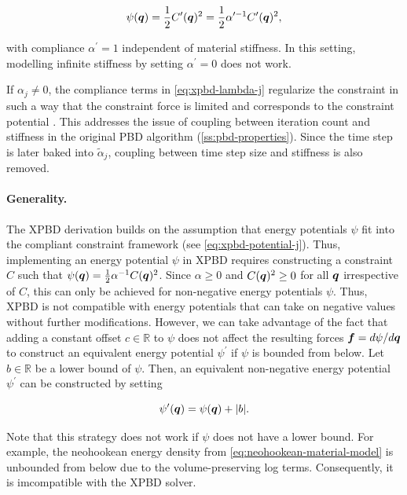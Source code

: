 \[
    \psi(\bm{q}) = \frac{1}{2} C^{\prime}(\bm{q})^2 = \frac{1}{2} \alpha^{\prime -1}C^{\prime}(\bm{q})^2,
\]

\noindent with compliance $\alpha^\prime = 1$ independent of material stiffness. In this setting, modelling infinite stiffness by setting 
$\alpha^\prime = 0$ does not work.

If $\alpha_j \neq 0$, the compliance terms in \autoref{eq:xpbd-lambda-j} regularize the constraint in such a way that the constraint force is 
limited and corresponds to the constraint potential \cite{macklin2016}. This addresses the issue of coupling between iteration count and stiffness in 
the original PBD algorithm (\cref{ss:pbd-properties}). Since the time step is later baked into $\tilde{\alpha}_j$, coupling between time step size 
and stiffness is also removed.

\paragraph{Generality.}
The XPBD derivation builds on the assumption that energy potentials $\psi$ fit into the compliant constraint framework (see \cref{eq:xpbd-potential-j}).
Thus, implementing an energy potential $\psi$ in XPBD requires constructing a constraint $C$ such that 
$\psi(\bm{q}) = \frac{1}{2} \alpha^{-1} C(\bm{q})^2$. Since $\alpha \geq 0$ and $C(\bm{q})^2 \geq 0$ for all $\bm{q}$ irrespective of $C$, this 
can only be achieved for non-negative energy potentials 
$\psi$. Thus, XPBD is not compatible with energy potentials that can take on negative values without further modifications. However, we can take 
advantage of the fact that adding a constant offset $c \in \mathbb{R}$ to $\psi$ does not affect the resulting forces $\bm{f} = d\psi / d\bm{q}$ 
to construct an equivalent energy potential $\psi^\prime$ if $\psi$ is bounded from below. Let $b \in \mathbb{R}$ be a lower bound of $\psi$. Then,
an equivalent non-negative energy potential $\psi^\prime$ can be constructed by setting

\begin{equation}\label{eq:xpbd-potential-non-negative}
    \psi^\prime(\bm{q}) = \psi(\bm{q}) + \vert b \vert.
\end{equation}

\noindent Note that this strategy does not work if $\psi$ does not have a lower bound. For example, the neohookean energy density from 
\autoref{eq:neohookean-material-model} is unbounded from below due to the volume-preserving log terms. Consequently, it is imcompatible with the XPBD 
solver.

